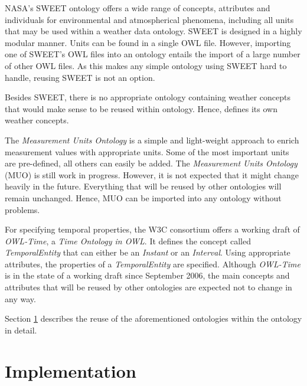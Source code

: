 NASA's SWEET ontology offers a wide range of concepts, attributes and individuals for environmental and atmospherical phenomena, including all units that may be used within a weather data ontology. SWEET is designed in a highly modular manner. Units can be found in a single OWL file. However, importing one of SWEET's OWL files into an ontology entails the import of a large number of other OWL files. As this makes any simple ontology using SWEET hard to handle, reusing SWEET is not an option.

Besides SWEET, there is no appropriate ontology containing weather concepts that would make sense to be reused within \thinkhomeweather ontology. Hence, \thinkhomeweather defines its own weather concepts.

The \emph{Measurement Units Ontology} is a simple and light-weight approach to enrich measurement values with appropriate units. Some of the most important units are pre-defined, all others can easily be added. The \emph{Measurement Units Ontology} (MUO) is still work in progress. However, it is not expected that it might change heavily in the future. Everything that will be reused by other ontologies will remain unchanged. Hence, MUO can be imported into any ontology without problems.

For specifying temporal properties, the W3C consortium offers a working draft of \emph{OWL-Time}, a \emph{Time Ontology in OWL}. It defines the concept called \emph{TemporalEntity} that can either be an \emph{Instant} or an \emph{Interval}. Using appropriate attributes, the properties of a \emph{TemporalEntity} are specified. Although \emph{OWL-Time} is in the state of a working draft since September 2006, the main concepts and attributes that will be reused by other ontologies are expected not to change in any way.


Section \ref{sec:implementation} describes the reuse of the aforementioned ontologies within the \thinkhomeweather ontology in detail.

\section{Implementation}
\label{sec:implementation}

